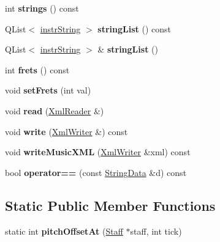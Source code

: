 \begin{DoxyCompactItemize}
int {\bfseries strings} () const
\item 
\mbox{\label{class_ms_1_1_string_data_aac9265d608214195399bfa6a9ce2faf0}} 
Q\+List$<$ \hyperlink{struct_ms_1_1instr_string}{instr\+String} $>$ {\bfseries string\+List} () const
\item 
\mbox{\label{class_ms_1_1_string_data_a5faadaf914ebd451b7aca5c9d9de9e85}} 
Q\+List$<$ \hyperlink{struct_ms_1_1instr_string}{instr\+String} $>$ \& {\bfseries string\+List} ()
\item 
\mbox{\label{class_ms_1_1_string_data_a715431405d3e920edb95f1a595e61dea}} 
int {\bfseries frets} () const
\item 
\mbox{\label{class_ms_1_1_string_data_a1477759c561e38ac190028de3bc14c67}} 
void {\bfseries set\+Frets} (int val)
\item 
\mbox{\label{class_ms_1_1_string_data_a34c70e5e2586bc24f2877546cbc2450b}} 
void {\bfseries read} (\hyperlink{class_ms_1_1_xml_reader}{Xml\+Reader} \&)
\item 
\mbox{\label{class_ms_1_1_string_data_af13bcaede4f514a705e6eb47bd57b107}} 
void {\bfseries write} (\hyperlink{class_ms_1_1_xml_writer}{Xml\+Writer} \&) const
\item 
\mbox{\label{class_ms_1_1_string_data_a5f06eee00f4e376849af324a8d45fdb4}} 
void {\bfseries write\+Music\+X\+ML} (\hyperlink{class_ms_1_1_xml_writer}{Xml\+Writer} \&xml) const
\item 
\mbox{\label{class_ms_1_1_string_data_a90013569fe22e25e1ec6afa2f6288f09}} 
bool {\bfseries operator==} (const \hyperlink{class_ms_1_1_string_data}{String\+Data} \&d) const
\end{DoxyCompactItemize}
\subsection*{Static Public Member Functions}
\begin{DoxyCompactItemize}
\item 
\mbox{\label{class_ms_1_1_string_data_a26d68656bbc480bd4d3a461f626805b0}} 
static int {\bfseries pitch\+Offset\+At} (\hyperlink{class_ms_1_1_staff}{Staff} $\ast$staff, int tick)
\end{DoxyCompactItemize}



